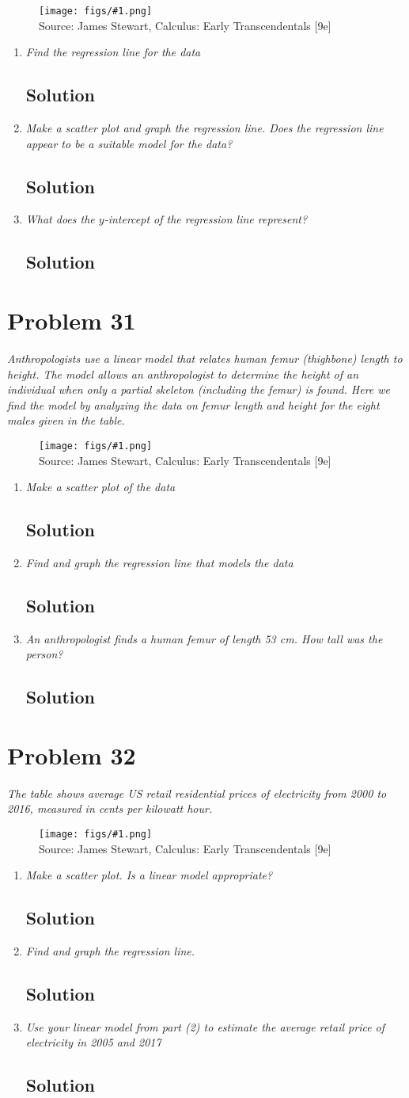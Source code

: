 \documentclass[11pt]{article}
\newcommand{\soln}{\subsection*}
\newcommand{\qn}{\textit}
\newcommand{\imagesource}[1]{{\footnotesize Source: #1}}
\newcommand{\imgqn}[1]{
	\begin{figure}[H]
		\centering
		\texttt{[image: figs/\#1.png]}\\
		\imagesource{James Stewart, Calculus: Early Transcendentals [9e]}
	\end{figure}
}
\begin{document}
\imgqn{1.2.30}

\begin{enumerate}
	\item \qn{Find the regression line for the data}
	\soln{Solution}
	
	\item \qn{Make a scatter plot and graph the regression line. Does the regression line appear to be a suitable model for the data?}
	\soln{Solution}
	
	\item \qn{What does the $y$-intercept of the regression line represent?}
	\soln{Solution}
\end{enumerate}

\section*{Problem 31}

\qn{Anthropologists use a linear model that relates human femur (thighbone) length to height. The model allows an anthropologist to determine the height of an individual when only a partial skeleton (including the femur) is found. Here we find the model by analyzing the data on femur length and height for the eight males given in the table.}

\imgqn{1.2.31}

\begin{enumerate}
	\item \qn{Make a scatter plot of the data}
	\soln{Solution}
	
	\item \qn{Find and graph the regression line that models the data}
	\soln{Solution}
	
	\item \qn{An anthropologist finds a human femur of length 53 cm. How tall was the person?}
	\soln{Solution}
\end{enumerate}

\section*{Problem 32}

\qn{The table shows average US retail residential prices of electricity from 2000 to 2016, measured in cents per kilowatt hour.}

\imgqn{1.2.32}

\begin{enumerate}
	\item \qn{Make a scatter plot. Is a linear model appropriate?}
	\soln{Solution}
	
	\item \qn{Find and graph the regression line.}
	\soln{Solution}
	
	\item \qn{Use your linear model from part (2) to estimate the average retail price of electricity in 2005 and 2017}
	\soln{Solution}
\end{enumerate}
\end{document}

